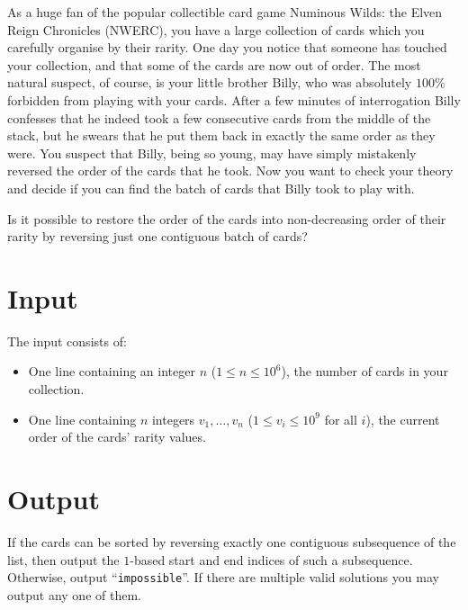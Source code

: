 
%
\noindent
As a huge fan of the popular collectible card game Numinous Wilds: the Elven Reign Chronicles (NWERC), you have a large collection of cards which you carefully organise by their rarity.
One day you notice that someone has touched your collection, and that some of the cards are now out of order. 
The most natural suspect, of course, is your little brother Billy, who was absolutely $100\%$ forbidden from playing with your cards.
After a few minutes of interrogation Billy confesses that he indeed took a few consecutive cards from the middle of the stack, but he swears that he put them back in exactly the same order as they were.
You suspect that Billy, being so young, may have simply mistakenly reversed the order of the cards that he took.
Now you want to check your theory and decide if you can find the batch of cards that Billy took to play with.

Is it possible to restore the order of the cards into non-decreasing order of their rarity by reversing
just one contiguous batch of cards?

\section*{Input}

The input consists of:

\begin{itemize}
  \item One line containing an integer $n$ ($1 \le n \le 10^6$), the number of cards in your collection.
  \item One line containing $n$ integers $v_1, \ldots, v_n$ ($1 \le v_{i} \le 10^9$ for all $i$), the current order of the cards' rarity values.
\end{itemize}

\section*{Output}

If the cards can be sorted by reversing exactly one contiguous subsequence of the list, then output the $1$-based start and end indices of such a subsequence.
Otherwise, output ``\texttt{impossible}''.
If there are multiple valid solutions you may output any one of them.
